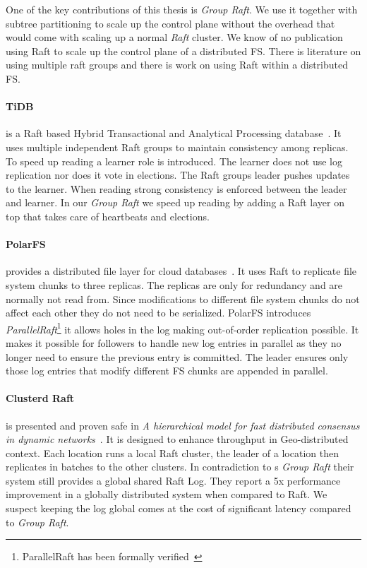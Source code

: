 One of the key contributions of this thesis is \textit{Group Raft}. We use it together with subtree partitioning to scale up the control plane without the overhead that would come with scaling up a normal \textit{Raft} cluster. We know of no publication using Raft to scale up the control plane of a distributed FS. There is literature on using multiple raft groups and there is work on using Raft within a distributed FS.

\paragraph{TiDB} is a Raft based Hybrid Transactional and Analytical Processing database~\cite{tidb}. It uses multiple independent Raft groups to maintain consistency among replicas. To speed up reading a learner role is introduced. The learner does not use log replication nor does it vote in elections. The Raft groups leader pushes updates to the learner. When reading strong consistency is enforced between the leader and learner. In our \textit{Group Raft} we speed up reading by adding a Raft layer on top that takes care of heartbeats and elections.

\paragraph{PolarFS} provides a distributed file layer for cloud databases~\cite{polarfs}. It uses Raft to replicate file system chunks to three replicas. The replicas are only for redundancy and are normally not read from. Since modifications to different file system chunks do not affect each other they do not need to be serialized. PolarFS introduces \textit{ParallelRaft}\footnote{ParallelRaft has been formally verified~\cite{verify}} it allows holes in the log making out-of-order replication possible. It makes it possible for followers to handle new log entries in parallel as they no longer need to ensure the previous entry is committed. The leader ensures only those log entries that modify different FS chunks are appended in parallel.

\paragraph{Clusterd Raft} is presented and proven safe in \textit{A hierarchical model for fast distributed consensus in dynamic networks}~\cite{craft}. It is designed to enhance throughput in Geo-distributed context. Each location runs a local Raft cluster, the leader of a location then replicates in batches to the other clusters. In contradiction to \name{}s \textit{Group Raft} their system still provides a global shared Raft Log. They report a 5x performance improvement in a globally distributed system when compared to Raft. We suspect keeping the log global comes at the cost of significant latency compared to \textit{Group Raft}.

